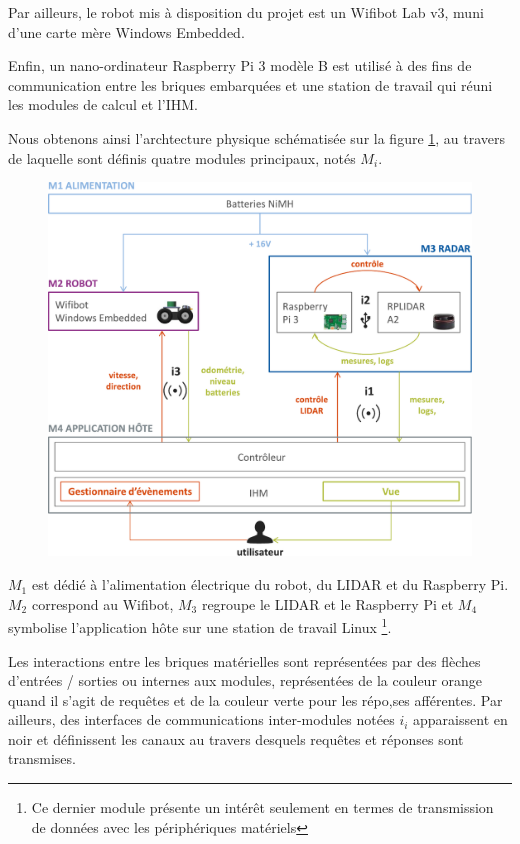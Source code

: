 Par ailleurs, le robot mis à disposition du projet est un Wifibot Lab v3, muni d'une carte mère Windows Embedded. 

Enfin, un nano-ordinateur Raspberry Pi 3 modèle B est utilisé à des fins de communication entre les briques embarquées et une station de travail qui réuni les modules de calcul et l'\gls{IHM}.

Nous obtenons ainsi l'archtecture physique schématisée sur la figure \ref{fig:archiphy}, au travers de laquelle sont définis quatre modules principaux, notés $M_{i}$.

\begin{figure}[h]
  \centering
    \includegraphics[width=.9\linewidth]{figures/archi-phy}  
  \label{fig:archiphy}
\end{figure}

$M_{1}$ est dédié à l'alimentation électrique du robot, du LIDAR et du Raspberry Pi.
$M_{2}$ correspond au Wifibot, $M_{3}$ regroupe le LIDAR et le Raspberry Pi et $M_{4}$ symbolise l'application hôte sur une station de travail Linux
\footnote{Ce dernier module présente un intérêt seulement en termes de transmission de données avec les périphériques matériels}.

Les interactions entre les briques matérielles sont représentées par des flèches d'entrées / sorties ou internes aux modules, représentées de la couleur orange quand il s'agit de requêtes et de la couleur verte pour 
les répo,ses afférentes. 
Par ailleurs, des interfaces de communications inter-modules notées $i_{i}$ apparaissent en noir et définissent les canaux au travers desquels requêtes et réponses sont transmises. 

